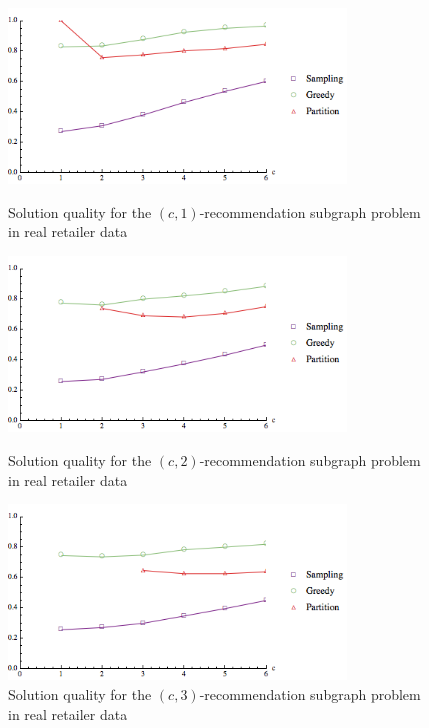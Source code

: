 \begin{figure}[t]
\centering
\begin{minipage}[h]{0.48\textwidth}
\centering
\includegraphics[width=0.8\textwidth]{images/real_a=1.png}
\caption{Solution quality for the $(c, 1)$-recommendation subgraph problem in real retailer data }\label{fig:real_a=1}
\end{minipage}
\hspace{0cm}
\begin{minipage}[h]{0.48\textwidth}
\centering
\includegraphics[width=0.8\textwidth]{images/real_a=2.png}
\caption{Solution quality for the $(c, 2)$-recommendation subgraph problem in real retailer data}\label{fig:real_a=2}
\end{minipage}
\hspace{0cm}
\centering
\begin{minipage}[h]{0.48\textwidth}
\centering
\includegraphics[width=0.8\textwidth]{images/real_a=3.png}
\caption{Solution quality for the $(c, 3)$-recommendation subgraph problem in real retailer data}\label{fig:real_a=3}
\end{minipage}
\vspace{-0.2in}
\end{figure} \vs

